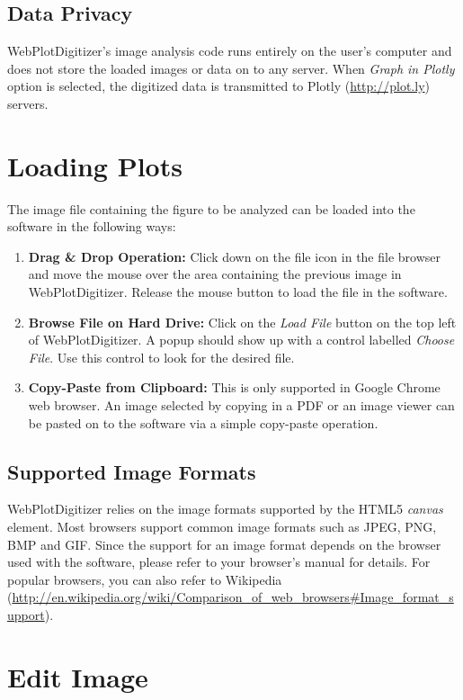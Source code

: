 \documentclass[letterpaper, 10pt]{article}
\begin{document}
\subsection{Data Privacy}
WebPlotDigitizer's image analysis code runs entirely on the user's computer and does not store the loaded images or data on to any server. When \emph{Graph in Plotly} option is selected, the digitized data is transmitted to Plotly (\url{http://plot.ly}) servers.

\section{Loading Plots}
The image file containing the figure to be analyzed can be loaded into the software in the following ways:
\begin{enumerate}
\item{{\bf Drag \& Drop Operation:} Click down on the file icon in the file browser and move the mouse over the area containing the previous image in WebPlotDigitizer. Release the mouse button to load the file in the software.}
\item{{\bf Browse File on Hard Drive:} Click on the \emph{Load File} button on the top left of WebPlotDigitizer. A popup should show up with a control labelled \emph{Choose File}. Use this control to look for the desired file.}
\item{{\bf Copy-Paste from Clipboard:} This is only supported in Google Chrome web browser. An image selected by copying in a PDF or an image viewer can be pasted on to the software via a simple copy-paste operation.}
\end{enumerate}

\subsection{Supported Image Formats}
WebPlotDigitizer relies on the image formats supported by the HTML5 \emph{canvas} element. Most browsers support common image formats such as JPEG, PNG, BMP and GIF. Since the support for an image format depends on the browser used with the software, please refer to your browser's manual for details. For popular browsers, you can also refer to Wikipedia (\url{http://en.wikipedia.org/wiki/Comparison_of_web_browsers#Image_format_support}).




\section{Edit Image}
\end{document}
